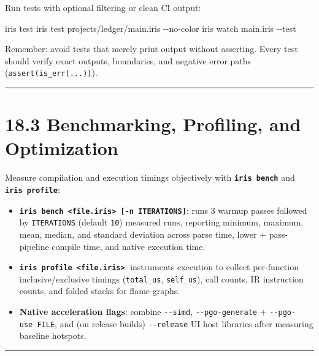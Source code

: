 \documentclass[
  english,
  oneside]{book}
\newenvironment{Shaded}{\begin{snugshade}}{\end{snugshade}}
\newcommand{\NormalTok}[1]{\textcolor[rgb]{0.83,0.83,0.83}{#1}}
\providecommand{\tightlist}{%
  \setlength{\itemsep}{0pt}\setlength{\parskip}{0pt}}
\begin{document}
Run tests with optional filtering or clean CI output:

\begin{Shaded}
\begin{Highlighting}[]
\NormalTok{iris test}
\NormalTok{iris test projects/ledger/main.iris {-}{-}no{-}color}
\NormalTok{iris watch main.iris {-}{-}test}
\end{Highlighting}
\end{Shaded}

Remember: avoid tests that merely print output without asserting. Every
test should verify exact outputs, boundaries, and negative error paths
(\texttt{assert(is\_err(...))}).

\begin{center}\rule{0.5\linewidth}{0.5pt}\end{center}

\section{18.3 Benchmarking, Profiling, and
Optimization}\label{benchmarking-profiling-and-optimization}

Measure compilation and execution timings objectively with
\textbf{\texttt{iris\ bench}} and \textbf{\texttt{iris\ profile}}:

\begin{itemize}
\tightlist
\item
  \textbf{\texttt{iris\ bench\ \textless{}file.iris\textgreater{}\ {[}-n\ ITERATIONS{]}}}:
  runs 3 warmup passes followed by \texttt{ITERATIONS} (default
  \texttt{10}) measured runs, reporting minimum, maximum, mean, median,
  and standard deviation across parse time, lower + pass-pipeline
  compile time, and native execution time.
\item
  \textbf{\texttt{iris\ profile\ \textless{}file.iris\textgreater{}}}:
  instruments execution to collect per-function inclusive/exclusive
  timings (\texttt{total\_us}, \texttt{self\_us}), call counts, IR
  instruction counts, and folded stacks for flame graphs.
\item
  \textbf{Native acceleration flags}: combine \texttt{-\/-simd},
  \texttt{-\/-pgo-generate} + \texttt{-\/-pgo-use\ FILE}, and (on
  release builds) \texttt{-\/-release} UI host libraries after measuring
  baseline hotspots.
\end{itemize}

\begin{center}\rule{0.5\linewidth}{0.5pt}\end{center}
\end{document}

